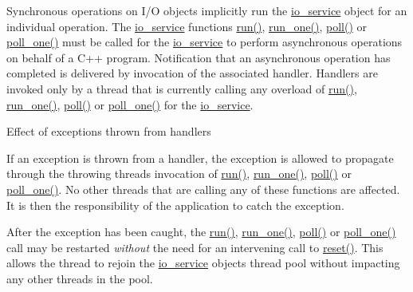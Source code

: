 Synchronous operations on I/\+O objects implicitly run the \hyperlink{classasio_1_1io__service}{io\+\_\+service} object for an individual operation. The \hyperlink{classasio_1_1io__service}{io\+\_\+service} functions \hyperlink{classasio_1_1io__service_ac84bed0d1dd061bc71010ba1228439da}{run()}, \hyperlink{classasio_1_1io__service_aa83c06ec5cc7bde25c64d89530998408}{run\+\_\+one()}, \hyperlink{classasio_1_1io__service_afcc99e506862edaf34ac124c0e7f0242}{poll()} or \hyperlink{classasio_1_1io__service_acbdbe60a4582f7f77f5bdb85d4e76013}{poll\+\_\+one()} must be called for the \hyperlink{classasio_1_1io__service}{io\+\_\+service} to perform asynchronous operations on behalf of a C++ program. Notification that an asynchronous operation has completed is delivered by invocation of the associated handler. Handlers are invoked only by a thread that is currently calling any overload of \hyperlink{classasio_1_1io__service_ac84bed0d1dd061bc71010ba1228439da}{run()}, \hyperlink{classasio_1_1io__service_aa83c06ec5cc7bde25c64d89530998408}{run\+\_\+one()}, \hyperlink{classasio_1_1io__service_afcc99e506862edaf34ac124c0e7f0242}{poll()} or \hyperlink{classasio_1_1io__service_acbdbe60a4582f7f77f5bdb85d4e76013}{poll\+\_\+one()} for the \hyperlink{classasio_1_1io__service}{io\+\_\+service}.

\begin{DoxyParagraph}{Effect of exceptions thrown from handlers}

\end{DoxyParagraph}
If an exception is thrown from a handler, the exception is allowed to propagate through the throwing thread\textquotesingle{}s invocation of \hyperlink{classasio_1_1io__service_ac84bed0d1dd061bc71010ba1228439da}{run()}, \hyperlink{classasio_1_1io__service_aa83c06ec5cc7bde25c64d89530998408}{run\+\_\+one()}, \hyperlink{classasio_1_1io__service_afcc99e506862edaf34ac124c0e7f0242}{poll()} or \hyperlink{classasio_1_1io__service_acbdbe60a4582f7f77f5bdb85d4e76013}{poll\+\_\+one()}. No other threads that are calling any of these functions are affected. It is then the responsibility of the application to catch the exception.

After the exception has been caught, the \hyperlink{classasio_1_1io__service_ac84bed0d1dd061bc71010ba1228439da}{run()}, \hyperlink{classasio_1_1io__service_aa83c06ec5cc7bde25c64d89530998408}{run\+\_\+one()}, \hyperlink{classasio_1_1io__service_afcc99e506862edaf34ac124c0e7f0242}{poll()} or \hyperlink{classasio_1_1io__service_acbdbe60a4582f7f77f5bdb85d4e76013}{poll\+\_\+one()} call may be restarted {\itshape without} the need for an intervening call to \hyperlink{classasio_1_1io__service_a28a4283881eba54d415409ad604384f8}{reset()}. This allows the thread to rejoin the \hyperlink{classasio_1_1io__service}{io\+\_\+service} object\textquotesingle{}s thread pool without impacting any other threads in the pool.

